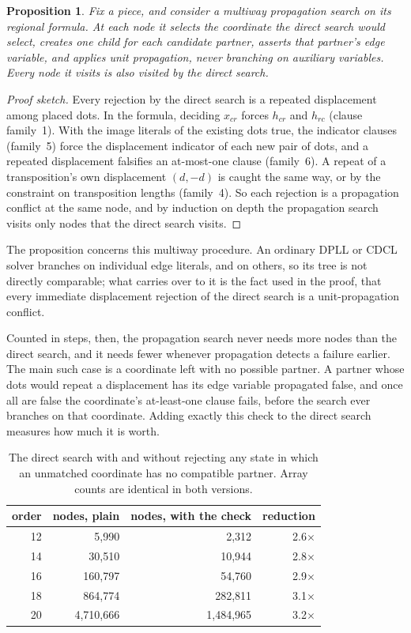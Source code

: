 \documentclass[11pt,a4paper,oneside]{report}
\newtheorem{proposition}[theorem]{Proposition}
\theoremstyle{definition}
\begin{document}
\begin{proposition}\label{p8-prop:simulation}
Fix a piece, and consider a \emph{multiway propagation search} on its regional formula. At each node
it selects the coordinate the direct search would select, creates one child for each candidate
partner, asserts that partner's edge variable, and applies unit propagation, never branching on
auxiliary variables. Every node it visits is also visited by the direct search.
\end{proposition}
\begin{proof}[Proof sketch]
Every rejection by the direct search is a repeated displacement among placed dots. In the
formula, deciding $x_{cr}$ forces $h_{cr}$ and $h_{rc}$ (clause family~1). With the image literals
of the existing dots true, the indicator clauses (family~5) force the displacement indicator of
each new pair of dots, and a repeated displacement falsifies an at-most-one clause (family~6).
A repeat of a transposition's own displacement $(d,-d)$ is caught the same way, or by the
constraint on transposition lengths (family~4). So each rejection is a propagation conflict at the same node, and by induction on depth the
propagation search visits only nodes that the direct search visits.
\end{proof}

\noindent The proposition concerns this multiway procedure. An ordinary DPLL or CDCL solver
branches on individual edge literals, and on others, so its tree is not directly comparable; what
carries over to it is the fact used in the proof, that every immediate displacement rejection of the
direct search is a unit-propagation conflict.

Counted in steps, then, the propagation search never needs more nodes than the direct search, and it needs fewer
whenever propagation detects a failure earlier. The main such case is a coordinate left with no
possible partner. A partner whose dots would repeat a displacement has its edge variable propagated
false, and once all are false the coordinate's at-least-one clause fails, before the search ever
branches on that coordinate. Adding exactly this check to the direct search measures how much it
is worth.

\begin{table}[H]
\centering
\begin{tabular}{@{}rrrr@{}}
\toprule
order & nodes, plain & nodes, with the check & reduction \\
\midrule
12 & 5{,}990 & 2{,}312 & 2.6$\times$ \\
14 & 30{,}510 & 10{,}944 & 2.8$\times$ \\
16 & 160{,}797 & 54{,}760 & 2.9$\times$ \\
18 & 864{,}774 & 282{,}811 & 3.1$\times$ \\
20 & 4{,}710{,}666 & 1{,}484{,}965 & 3.2$\times$ \\
\bottomrule
\end{tabular}
\caption{The direct search with and without rejecting any state in which an unmatched coordinate
has no compatible partner. Array counts are identical in both versions.}
\label{p8-tab:wipeout}
\end{table}
\end{document}
